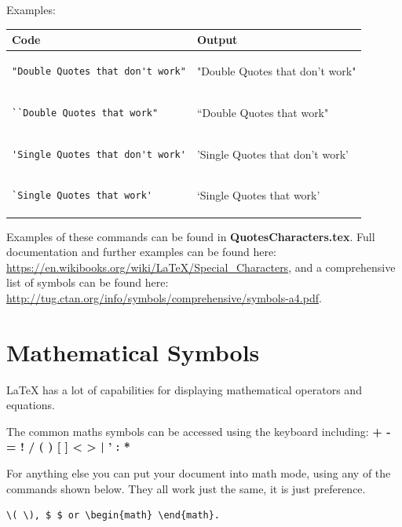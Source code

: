 \documentclass[10pt, titlepage]{article}
\begin{document}
Examples:\\
\begin{tabular}{|p{240pt}|p{240pt}|}\hline
\textbf{Code}  & \textbf{Output} \\\hline
\begin{lstlisting}
"Double Quotes that don't work"
\end{lstlisting} & \vspace{8pt}"Double Quotes that don't work" \\ \hline
\begin{lstlisting}
``Double Quotes that work"
\end{lstlisting} & \vspace{8pt} ``Double Quotes that work" \\ \hline
\begin{lstlisting}
'Single Quotes that don't work'
\end{lstlisting} & \vspace{8pt} 'Single Quotes that don't work' \\ \hline
\begin{lstlisting}
`Single Quotes that work'
\end{lstlisting} & \vspace{8pt} `Single Quotes that work' \\ \hline
\end{tabular}

Examples of these commands can be found in \textbf{QuotesCharacters.tex}. Full documentation and further examples can be found here: \url{https://en.wikibooks.org/wiki/LaTeX/Special_Characters}, and a comprehensive list of symbols can be found here: \url{http://tug.ctan.org/info/symbols/comprehensive/symbols-a4.pdf}.

\newpage
\section{Mathematical Symbols}
LaTeX has a lot of capabilities for displaying mathematical operators and equations. 

The common maths symbols can be accessed using the keyboard including:  \textbf{+ - = ! / ( ) [ ] < > | ' : *}

For anything else you can put your document into math mode, using any of the commands shown below. They all work just the same, it is just preference.
\begin{lstlisting}
\( \), $ $ or \begin{math} \end{math}.
\end{lstlisting}
\end{document}
